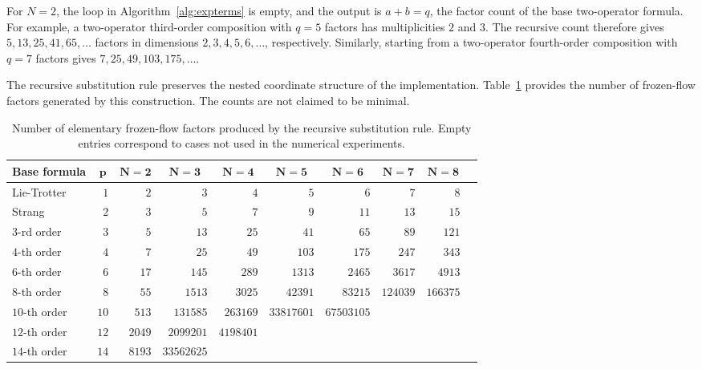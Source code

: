 \documentclass[preprint,1p,times,nopreprintline]{elsarticle}
\begin{document}
For $N=2$, the loop in Algorithm~\ref{alg:expterms} is empty, and the output is $a+b=q$, the factor count of the base two-operator formula. For example, a two-operator third-order composition with $q=5$ factors has multiplicities $2$ and $3$. The recursive count therefore gives $5,13,25,41,65,\ldots$ factors in dimensions $2,3,4,5,6,\ldots$, respectively. Similarly, starting from a two-operator fourth-order composition with $q=7$ factors gives $7,25,49,103,175,\ldots$.

The recursive substitution rule preserves the nested coordinate structure of the implementation. Table~\ref{tabNterms} provides the number of frozen-flow factors generated by this construction. The counts are not claimed to be minimal.

\begin{table}[t!]
\centering
\caption{Number of elementary frozen-flow factors produced by the recursive substitution rule. Empty entries correspond to cases not used in the numerical experiments.}
\label{tabNterms}
\setlength{\tabcolsep}{4pt}
\fontsize{8}{8}\selectfont
\begin{tabular}{lrrrrrrrrr}
\toprule
\multicolumn{1}{c}{\textbf{Base formula}} &
\multicolumn{1}{c}{$\mathbf{p}$} &
\multicolumn{1}{c}{$\mathbf{N=2}$} &
\multicolumn{1}{c}{$\mathbf{N=3}$} &
\multicolumn{1}{c}{$\mathbf{N=4}$} &
\multicolumn{1}{c}{$\mathbf{N=5}$} &
\multicolumn{1}{c}{$\mathbf{N=6}$} &
\multicolumn{1}{c}{$\mathbf{N=7}$} &
\multicolumn{1}{c}{$\mathbf{N=8}$}\\
\midrule
\rowcolor{gray!10} Lie-Trotter & $1$  & $2$ & $3$ & $4$ & $5$ & $6$ & $7$ & $8$ \\
\rowcolor{white} Strang          & $2$  & $3$ & $5$ & $7$ & $9$ & $11$ & $13$ & $15$ \\
\rowcolor{gray!10} $3$-rd order   & $3$  & $5$ & $13$ & $25$ & $41$ & $65$ & $89$ & $121$ \\
\rowcolor{white} $4$-th order    & $4$  & $7$ & $25$ & $49$ & $103$ & $175$ & $247$ & $343$ \\
\rowcolor{gray!10} $6$-th order   & $6$  & $17$ & $145$ & $289$ & $1313$ & $2465$ & $3617$ & $4913$ \\
\rowcolor{white} $8$-th order    & $8$  & $55$ & $1513$ & $3025$ & $42391$ & $83215$ & $124039$ & $166375$ \\
\rowcolor{gray!10} $10$-th order   & $10$ & $513$ & $131585$ & $263169$ & $33817601$ & $67503105$ & & \\
\rowcolor{white} $12$-th order   & $12$ & $2049$ & $2099201$ & $4198401$ & & & & \\
\rowcolor{gray!10} $14$-th order & $14$ & $8193$ & $33562625$ & & & & & \\
\bottomrule
\end{tabular}
\end{table}
\end{document}
